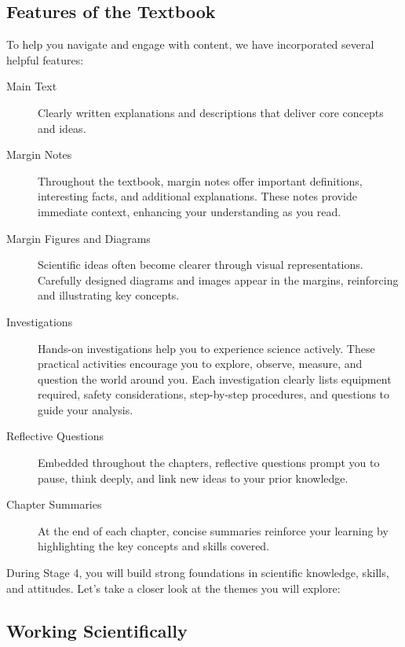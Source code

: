 \subsection{Features of the Textbook}

To help you navigate and engage with content, we have incorporated several helpful features:

\begin{description}

\item[Main Text] Clearly written explanations and descriptions that deliver core concepts and ideas.

\item[Margin Notes] Throughout the textbook, margin notes offer important definitions, interesting facts, and additional explanations. These notes provide immediate context, enhancing your understanding as you read.

\item[Margin Figures and Diagrams] Scientific ideas often become clearer through visual representations. Carefully designed diagrams and images appear in the margins, reinforcing and illustrating key concepts.

\item[Investigations] Hands-on investigations help you to experience science actively. These practical activities encourage you to explore, observe, measure, and question the world around you. Each investigation clearly lists equipment required, safety considerations, step-by-step procedures, and questions to guide your analysis.

\item[Reflective Questions] Embedded throughout the chapters, reflective questions prompt you to pause, think deeply, and link new ideas to your prior knowledge.

\item[Chapter Summaries] At the end of each chapter, concise summaries reinforce your learning by highlighting the key concepts and skills covered.

\end{description}

\FloatBarrier

\FloatBarrier
\1

During Stage 4, you will build strong foundations in scientific knowledge, skills, and attitudes. Let's take a closer look at the themes you will explore:

\subsection{Working Scientifically}

